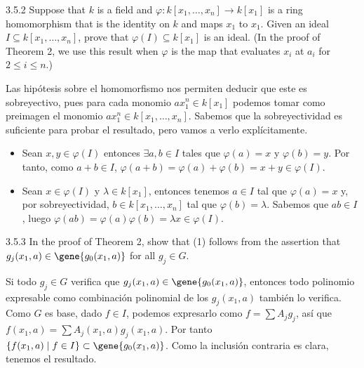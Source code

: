 \documentclass[twoside]{article}
\begin{document}
\begin{ejercicio}{3.5.2}
Suppose that $k$ is a field and $\varphi \colon k[x_1,\dots,x_n] \to k[x_1]$ is a ring homomorphism that is the identity on $k$ and maps $x_1$ to $x_1$.
Given an ideal $I \subseteq k[x_1,\dots,x_n]$, prove that $\varphi(I) \subseteq k[x_1]$ is an ideal.
(In the proof of Theorem 2, we use this result when $\varphi$ is the map that evaluates $x_i$ at $a_i$ for $2 \leq i \leq n$.)
\end{ejercicio}
\begin{solucion}
Las hipótesis sobre el homomorfismo nos permiten deducir que este es sobreyectivo, pues para cada monomio $ax_1^n \in k[x_1]$ podemos tomar como preimagen el monomio $ax_1^n \in k[x_1,\dots,x_n]$. Sabemos que la sobreyectividad es suficiente para probar el resultado, pero vamos a verlo explícitamente.
\begin{itemize}
\item Sean $x,y \in \varphi(I)$ entonces $\exists a,b\in I$ tales que $\varphi(a)=x$ y $\varphi(b)=y$. Por tanto, como $a+b \in I$, $\varphi(a+b)=\varphi(a)+\varphi(b)=x+y\in \varphi(I)$.
\item Sean $x \in \varphi(I)$ y $\lambda \in k[x_1]$, entonces tenemos $a\in I$ tal que $\varphi(a)=x$ y, por sobreyectividad, $b\in k[x_1,\dotsc,x_n]$ tal que $\varphi(b)=\lambda$. Sabemos que $ab\in I$, luego $\varphi(ab)=\varphi(a)\varphi(b)=\lambda x \in \varphi(I)$.
\end{itemize}
\end{solucion}

\newpage

\begin{ejercicio}{3.5.3}
In the proof of Theorem 2, show that (1) follows from the assertion that $g_j(x_1,a) \in \gene{g_0(x_1,a)}$ for all $g_j \in G$.
\end{ejercicio}
\begin{solucion}
Si todo $g_j \in G$ verifica que $g_j(x_1,a) \in \gene{g_0(x_1,a)}$, entonces todo polinomio expresable como combinación polinomial de los $g_j(x_1,a)$ también lo verifica. Como $G$ es base, dado $f\in I$, podemos expresarlo como $f=\sum A_jg_j$, así que $f(x_1,a)=\sum A_j(x_1,a)g_j(x_1,a)$. Por tanto $\{f(x_1,a)\mid f \in I\}\subset \gene{g_0(x_1,a)}$. Como la inclusión contraria es clara, tenemos el resultado.
\end{solucion}
\newpage
\end{document}
